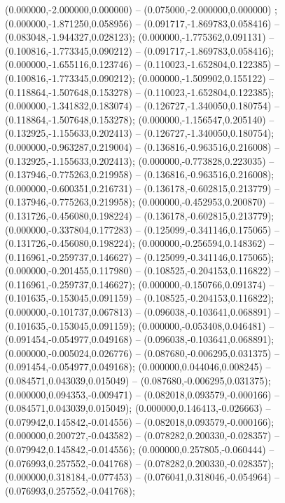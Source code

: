  (0.000000,-2.000000,0.000000) -- (0.075000,-2.000000,0.000000) ;
 (0.000000,-1.871250,0.058956) -- (0.091717,-1.869783,0.058416) -- (0.083048,-1.944327,0.028123);
 (0.000000,-1.775362,0.091131) -- (0.100816,-1.773345,0.090212) -- (0.091717,-1.869783,0.058416);
 (0.000000,-1.655116,0.123746) -- (0.110023,-1.652804,0.122385) -- (0.100816,-1.773345,0.090212);
 (0.000000,-1.509902,0.155122) -- (0.118864,-1.507648,0.153278) -- (0.110023,-1.652804,0.122385);
 (0.000000,-1.341832,0.183074) -- (0.126727,-1.340050,0.180754) -- (0.118864,-1.507648,0.153278);
 (0.000000,-1.156547,0.205140) -- (0.132925,-1.155633,0.202413) -- (0.126727,-1.340050,0.180754);
 (0.000000,-0.963287,0.219004) -- (0.136816,-0.963516,0.216008) -- (0.132925,-1.155633,0.202413);
 (0.000000,-0.773828,0.223035) -- (0.137946,-0.775263,0.219958) -- (0.136816,-0.963516,0.216008);
 (0.000000,-0.600351,0.216731) -- (0.136178,-0.602815,0.213779) -- (0.137946,-0.775263,0.219958);
 (0.000000,-0.452953,0.200870) -- (0.131726,-0.456080,0.198224) -- (0.136178,-0.602815,0.213779);
 (0.000000,-0.337804,0.177283) -- (0.125099,-0.341146,0.175065) -- (0.131726,-0.456080,0.198224);
 (0.000000,-0.256594,0.148362) -- (0.116961,-0.259737,0.146627) -- (0.125099,-0.341146,0.175065);
 (0.000000,-0.201455,0.117980) -- (0.108525,-0.204153,0.116822) -- (0.116961,-0.259737,0.146627);
 (0.000000,-0.150766,0.091374) -- (0.101635,-0.153045,0.091159) -- (0.108525,-0.204153,0.116822);
 (0.000000,-0.101737,0.067813) -- (0.096038,-0.103641,0.068891) -- (0.101635,-0.153045,0.091159);
 (0.000000,-0.053408,0.046481) -- (0.091454,-0.054977,0.049168) -- (0.096038,-0.103641,0.068891);
 (0.000000,-0.005024,0.026776) -- (0.087680,-0.006295,0.031375) -- (0.091454,-0.054977,0.049168);
 (0.000000,0.044046,0.008245) -- (0.084571,0.043039,0.015049) -- (0.087680,-0.006295,0.031375);
 (0.000000,0.094353,-0.009471) -- (0.082018,0.093579,-0.000166) -- (0.084571,0.043039,0.015049);
 (0.000000,0.146413,-0.026663) -- (0.079942,0.145842,-0.014556) -- (0.082018,0.093579,-0.000166);
 (0.000000,0.200727,-0.043582) -- (0.078282,0.200330,-0.028357) -- (0.079942,0.145842,-0.014556);
 (0.000000,0.257805,-0.060444) -- (0.076993,0.257552,-0.041768) -- (0.078282,0.200330,-0.028357);
 (0.000000,0.318184,-0.077453) -- (0.076041,0.318046,-0.054964) -- (0.076993,0.257552,-0.041768);
